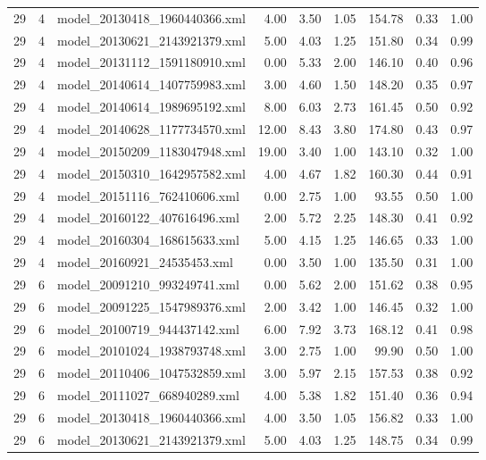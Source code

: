 \begin{table}[ht]
\begin{tabular}{rrlrrrrrr}
   29 &   4 & model\_20130418\_1960440366.xml & 4.00 & 3.50 & 1.05 & 154.78 & 0.33 & 1.00 \\ 
   29 &   4 & model\_20130621\_2143921379.xml & 5.00 & 4.03 & 1.25 & 151.80 & 0.34 & 0.99 \\ 
   29 &   4 & model\_20131112\_1591180910.xml & 0.00 & 5.33 & 2.00 & 146.10 & 0.40 & 0.96 \\ 
   29 &   4 & model\_20140614\_1407759983.xml & 3.00 & 4.60 & 1.50 & 148.20 & 0.35 & 0.97 \\ 
   29 &   4 & model\_20140614\_1989695192.xml & 8.00 & 6.03 & 2.73 & 161.45 & 0.50 & 0.92 \\ 
   29 &   4 & model\_20140628\_1177734570.xml & 12.00 & 8.43 & 3.80 & 174.80 & 0.43 & 0.97 \\ 
   29 &   4 & model\_20150209\_1183047948.xml & 19.00 & 3.40 & 1.00 & 143.10 & 0.32 & 1.00 \\ 
   29 &   4 & model\_20150310\_1642957582.xml & 4.00 & 4.67 & 1.82 & 160.30 & 0.44 & 0.91 \\ 
   29 &   4 & model\_20151116\_762410606.xml & 0.00 & 2.75 & 1.00 & 93.55 & 0.50 & 1.00 \\ 
   29 &   4 & model\_20160122\_407616496.xml & 2.00 & 5.72 & 2.25 & 148.30 & 0.41 & 0.92 \\ 
   29 &   4 & model\_20160304\_168615633.xml & 5.00 & 4.15 & 1.25 & 146.65 & 0.33 & 1.00 \\ 
   29 &   4 & model\_20160921\_24535453.xml & 0.00 & 3.50 & 1.00 & 135.50 & 0.31 & 1.00 \\ 
   29 &   6 & model\_20091210\_993249741.xml & 0.00 & 5.62 & 2.00 & 151.62 & 0.38 & 0.95 \\ 
   29 &   6 & model\_20091225\_1547989376.xml & 2.00 & 3.42 & 1.00 & 146.45 & 0.32 & 1.00 \\ 
   29 &   6 & model\_20100719\_944437142.xml & 6.00 & 7.92 & 3.73 & 168.12 & 0.41 & 0.98 \\ 
   29 &   6 & model\_20101024\_1938793748.xml & 3.00 & 2.75 & 1.00 & 99.90 & 0.50 & 1.00 \\ 
   29 &   6 & model\_20110406\_1047532859.xml & 3.00 & 5.97 & 2.15 & 157.53 & 0.38 & 0.92 \\ 
   29 &   6 & model\_20111027\_668940289.xml & 4.00 & 5.38 & 1.82 & 151.40 & 0.36 & 0.94 \\ 
   29 &   6 & model\_20130418\_1960440366.xml & 4.00 & 3.50 & 1.05 & 156.82 & 0.33 & 1.00 \\ 
   29 &   6 & model\_20130621\_2143921379.xml & 5.00 & 4.03 & 1.25 & 148.75 & 0.34 & 0.99 \\ 

\end{tabular}
\end{table}
